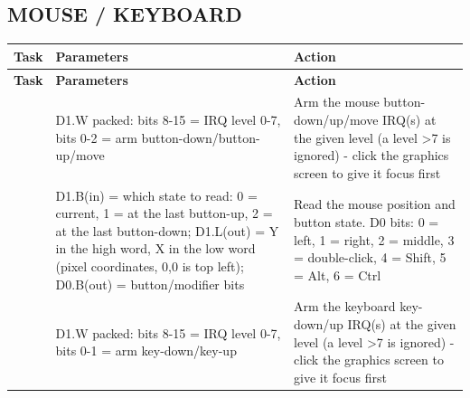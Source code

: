 \subsection*{MOUSE / KEYBOARD}
\begin{longtable}{@{}p{1.7cm}p{5.2cm}p{7.3cm}@{}}
\toprule
\textbf{Task} & \textbf{Parameters} & \textbf{Action} \\
\midrule
\endfirsthead
\toprule
\textbf{Task} & \textbf{Parameters} & \textbf{Action} \\
\midrule
\endhead
\ttfamily 60 & D1.W packed: bits 8-15 = IRQ level 0-7, bits 0-2 = arm button-down/button-up/move & Arm the mouse button-down/up/move IRQ(s) at the given level (a level >7 is ignored) - click the graphics screen to give it focus first \\
\ttfamily 61 & D1.B(in) = which state to read: 0 = current, 1 = at the last button-up, 2 = at the last button-down; D1.L(out) = Y in the high word, X in the low word (pixel coordinates, 0,0 is top left); D0.B(out) = button/modifier bits & Read the mouse position and button state. D0 bits: 0 = left, 1 = right, 2 = middle, 3 = double-click, 4 = Shift, 5 = Alt, 6 = Ctrl \\
\ttfamily 62 & D1.W packed: bits 8-15 = IRQ level 0-7, bits 0-1 = arm key-down/key-up & Arm the keyboard key-down/up IRQ(s) at the given level (a level >7 is ignored) - click the graphics screen to give it focus first \\
\bottomrule
\end{longtable}
